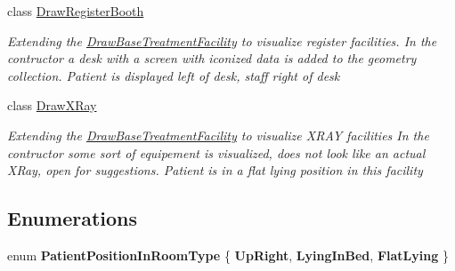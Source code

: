 \begin{DoxyCompactItemize}
class \hyperlink{class_simulation_w_p_f_visualization_tools_1_1_health_care_objects_1_1_draw_register_booth}{Draw\+Register\+Booth}
\begin{DoxyCompactList}\small\item\em Extending the \hyperlink{class_simulation_w_p_f_visualization_tools_1_1_health_care_objects_1_1_draw_base_treatment_facility}{Draw\+Base\+Treatment\+Facility} to visualize register facilities. In the contructor a desk with a screen with iconized data is added to the geometry collection. Patient is displayed left of desk, staff right of desk \end{DoxyCompactList}\item 
class \hyperlink{class_simulation_w_p_f_visualization_tools_1_1_health_care_objects_1_1_draw_x_ray}{Draw\+X\+Ray}
\begin{DoxyCompactList}\small\item\em Extending the \hyperlink{class_simulation_w_p_f_visualization_tools_1_1_health_care_objects_1_1_draw_base_treatment_facility}{Draw\+Base\+Treatment\+Facility} to visualize X\+R\+AY facilities In the contructor some sort of equipement is visualized, does not look like an actual X\+Ray, open for suggestions. Patient is in a flat lying position in this facility \end{DoxyCompactList}\end{DoxyCompactItemize}
\subsection*{Enumerations}
\begin{DoxyCompactItemize}
\item 
enum {\bfseries Patient\+Position\+In\+Room\+Type} \{ {\bfseries Up\+Right}, 
{\bfseries Lying\+In\+Bed}, 
{\bfseries Flat\+Lying}
 \}\hypertarget{namespace_simulation_w_p_f_visualization_tools_1_1_health_care_objects_af960e52fa86fa0504c012fcc84c0052a}{}\label{namespace_simulation_w_p_f_visualization_tools_1_1_health_care_objects_af960e52fa86fa0504c012fcc84c0052a}

\end{DoxyCompactItemize}
